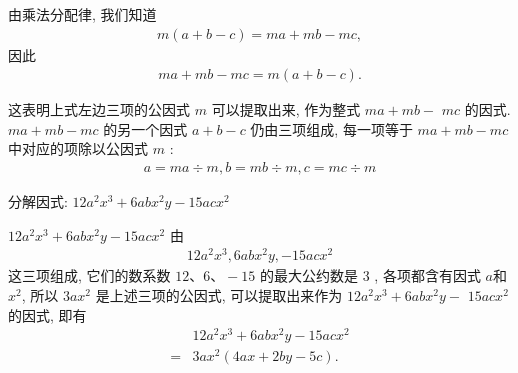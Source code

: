 由乘法分配律, 我们知道
\begin{align*}
	m(a+b-c)=m a+m b-m c,
\end{align*}
因此
\begin{align*}
	m a+m b-m c=m(a+b-c) .
\end{align*}

这表明上式左边三项的公因式 $m$ 可以提取出来, 作为整式 $m a+m b-$ $m c$ 的因式. $m a+m b-m c$ 的另一个因式 $a+b-c$ 仍由三项组成, 每一项等于 $m a+m b-m c$ 中对应的项除以公因式 $m$ :
\begin{align*}
	a=m a \div m, b=m b \div m, c=m c \div m
\end{align*}

\begin{example}[一次提净]\label{ex:提公因式-例1-一次提净}
	分解因式: $12 a^{2} x^{3}+6 a b x^{2} y-15 a c x^{2}$
\end{example}
\begin{solution}
	$12 a^{2} x^{3}+6 a b x^{2} y-15 a c x^{2}$ 由
	\begin{align*}
		12 a^{2} x^{3}, 6 a b x^{2} y,-15 a c x^{2}
	\end{align*}
	这三项组成, 它们的数系数 $12 、 6 、-15$ 的最大公约数是 3 , 各项都含有因式 $a$和 $x^{2}$, 所以 $3 a x^{2}$ 是上述三项的公因式, 可以提取出来作为 $12 a^{2} x^{3}+6 a b x^{2} y-$ $15 a c x^{2}$ 的因式, 即有
	\begin{align*}
		  & 12 a^{2} x^{3}+6 a b x^{2} y-15 a c x^{2} \\
		= & 3 a x^{2}(4 a x+2 b y-5 c) .
	\end{align*}
\end{solution}
